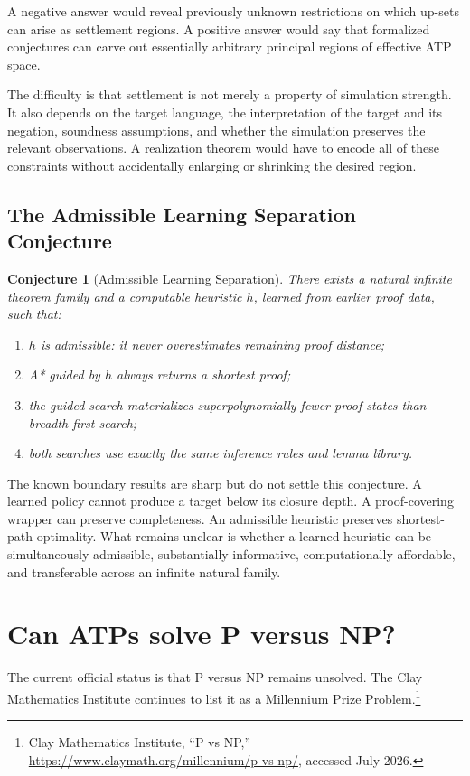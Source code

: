 \documentclass[11pt,letterpaper]{article}
\theoremstyle{named}
\newtheorem{conjecture}{Conjecture}[section]
\begin{document}
A negative answer would reveal previously unknown restrictions on which up-sets can arise as settlement regions. A positive answer would say that formalized conjectures can carve out essentially arbitrary principal regions of effective ATP space.

The difficulty is that settlement is not merely a property of simulation strength. It also depends on the target language, the interpretation of the target and its negation, soundness assumptions, and whether the simulation preserves the relevant observations. A realization theorem would have to encode all of these constraints without accidentally enlarging or shrinking the desired region.

\subsection{The Admissible Learning Separation Conjecture}

\begin{conjecture}[Admissible Learning Separation]
There exists a natural infinite theorem family and a computable heuristic $h$, learned from earlier proof data, such that:
\begin{enumerate}
\item $h$ is admissible: it never overestimates remaining proof distance;
\item A* guided by $h$ always returns a shortest proof;
\item the guided search materializes superpolynomially fewer proof states than breadth-first search;
\item both searches use exactly the same inference rules and lemma library.
\end{enumerate}
\end{conjecture}

The known boundary results are sharp but do not settle this conjecture. A learned policy cannot produce a target below its closure depth. A proof-covering wrapper can preserve completeness. An admissible heuristic preserves shortest-path optimality. What remains unclear is whether a learned heuristic can be simultaneously admissible, substantially informative, computationally affordable, and transferable across an infinite natural family.

\section{Can ATPs solve P versus NP?}

The current official status is that P versus NP remains unsolved. The Clay Mathematics Institute continues to list it as a Millennium Prize Problem.\footnote{Clay Mathematics Institute, ``P vs NP,'' \url{https://www.claymath.org/millennium/p-vs-np/}, accessed July 2026.}
\end{document}
